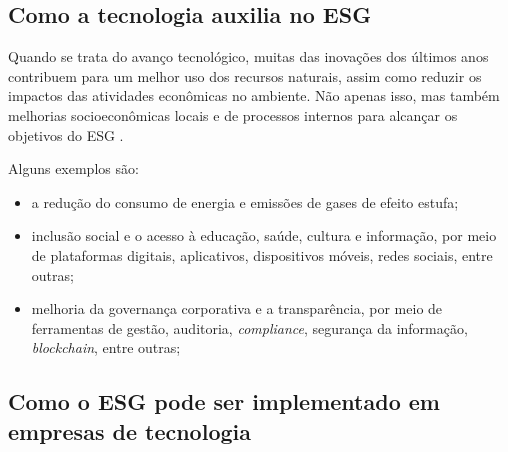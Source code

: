 \documentclass[12pt]{article}
\begin{document}
	\subsection*{Como a tecnologia auxilia no ESG}
	
	Quando se trata do avanço tecnológico, muitas das inovações dos últimos anos contribuem para um melhor uso dos recursos naturais, assim como reduzir os impactos das atividades econômicas no ambiente. Não apenas isso, mas também melhorias socioeconômicas locais e de processos internos para alcançar os objetivos do ESG \cite{cabralPraticasESGAplicadas2023}.
	
	Alguns exemplos são:
	
	\begin{itemize}
		\item a redução do consumo de energia e emissões de gases de efeito estufa;
		\item inclusão social e o acesso à educação, saúde, cultura e informação, por meio de plataformas digitais, aplicativos, dispositivos móveis, redes sociais, entre outras;
		\item melhoria da governança corporativa e a transparência, por meio de ferramentas de gestão, auditoria, \emph{compliance}, segurança da informação, \emph{blockchain}, entre outras;
	\end{itemize}
	
	\subsection*{Como o ESG pode ser implementado em empresas de tecnologia}
	
	
	
	
	
\end{document}
